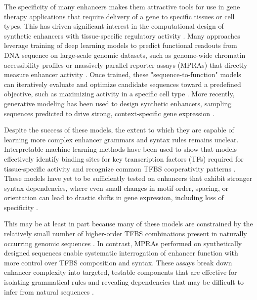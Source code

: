 The specificity of many enhancers makes them attractive tools for use in gene therapy applications that require delivery of a gene to specific tissues or cell types. This has driven significant interest in the computational design of synthetic enhancers with tissue-specific regulatory activity \cite{De-Winter2025-nz}. Many approaches leverage training of deep learning models to predict functional readouts from DNA sequence on large-scale genomic datasets, such as genome-wide chromatin accessibility profiles \cite{Taskiran2023-xz,De_Almeida2023-xu} or massively parallel reporter assays (MPRAs) that directly measure enhancer activity \cite{De_Almeida2022-aa,Gosai2023-cw,De_Boer2020-mw,White2016-ks}. Once trained, these "sequence-to-function" models \cite{Sasse2024-ly} can iteratively evaluate and optimize candidate sequences toward a predefined objective, such as maximizing activity in a specific cell type \cite{Gosai2023-cw,Taskiran2023-xz}. More recently, generative modeling has been used to design synthetic enhancers, sampling sequences predicted to drive strong, context-specific gene expression \cite{noauthor_undated-wu,Penzar2023-vr}.

Despite the success of these models, the extent to which they are capable of learning more complex enhancer grammars and syntax rules remains unclear. Interpretable machine learning methods \cite{Novakovsky2022-ft} have been used to show that models effectively identify binding sites for key transcription factors (TFs) required for tissue-specific activity and recognize common TFBS cooperativity patterns \cite{Avsec2021-sw,De_Almeida2022-aa,Gosai2023-cw,Taskiran2023-xz}. These models have yet to be sufficiently tested on enhancers that exhibit stronger syntax dependencies, where even small changes in motif order, spacing, or orientation can lead to drastic shifts in gene expression, including loss of specificity \cite{Lim2024-ph,Jindal2022-qf,Farley2016-eh}.

This may be at least in part because many of these models are constrained by the relatively small number of higher-order TFBS combinations present in naturally occurring genomic sequences \cite{De_Boer2024-ic}. In contrast, MPRAs performed on synthetically designed sequences enable systematic interrogation of enhancer function with more control over TFBS composition and syntax. These assays break down enhancer complexity into targeted, testable components that are effective for isolating grammatical rules and revealing dependencies that may be difficult to infer from natural sequences \cite{Fromel2024-ux,King2020-hk}.

